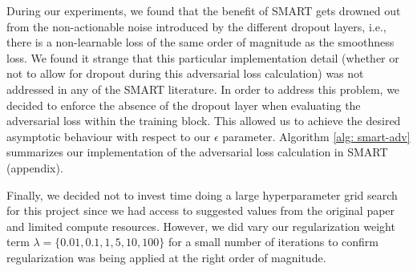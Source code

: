 \documentclass{article}
\begin{document}
During our experiments, we found that the benefit of SMART gets drowned out from the non-actionable noise introduced by the different dropout layers, i.e., there is a non-learnable loss of the same order of magnitude as the smoothness loss. We found it strange that this particular implementation detail (whether or not to allow for dropout during this adversarial loss calculation) was not addressed in any of the SMART literature. In order to address this problem, we decided to enforce the absence of the dropout layer when evaluating the adversarial loss within the training block. This allowed us to achieve the desired asymptotic behaviour with respect to our $\epsilon$ parameter. Algorithm \ref{alg: smart-adv} summarizes our implementation of the adversarial loss calculation in SMART (appendix).

Finally, we decided not to invest time doing a large hyperparameter grid search for this project since we had access to suggested values from the original paper and limited compute resources. However, we did vary our regularization weight term $\lambda = \{0.01, 0.1, 1, 5, 10, 100\}$ for a small number of iterations to confirm regularization was being applied at the right order of magnitude.

\end{document}
